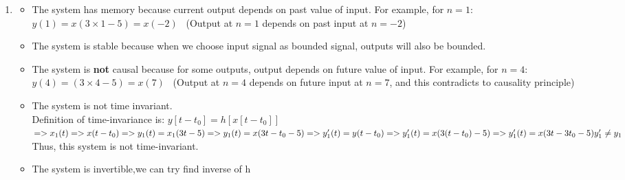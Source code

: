 \documentclass[10pt,a4paper, margin=1in]{article}
\begin{document}
\begin{enumerate}
\begin{enumerate}
\begin{itemize}
  	 $y[n] = h[x[3n - 5]]\\
  	 x[n]= h^{-1}[y[(n+5)/3]]$
  	 \item The system is linear if superposition property hold\\
  	 $y[n]=x[3n-5]\\
  	 y_1[n]=x_1[3n-5]\\
  	 y_2[n]=x_2[3n-5]\\
  	 x_3=a_1 \times x_1 + a_2 \times x_2 \\
  	 y_3=x_3[3n-5]\\
  	 y_3=a_1\times x_1[3n-5]+a_2 \times x_2[3n-5]\\
  	 y_3' = a_1 \times y_1+a_2 \times y_2\\
  	 y_3=y_3' $
  	 This system is linear
  	 
	\end{itemize}
    \item %
    \begin{itemize}
    \item The system has memory because current output depends on past value of input. For example, for $n = 1$: \\
  	$y(1) = x(3 \times 1 -5) = x(-2)$ \ (Output at $n=1$ depends on past input at $n=-2$)
  	\item The system is stable because when we choose input signal as bounded signal, outputs will also be bounded.
  	\item The system is \textbf{not} causal because for some outputs, output depends on future value of input. For example, for $n=4$: \\
  	 $y(4) = (3 \times 4 -5) = x(7)$ \ (Output at $n=4$ depends on future input at $n=7$, and this contradicts to causality principle)
  	 \item	The system is not time invariant. \\
  	  Definition of time-invariance is: $y[t-t_0] = h[x[t - t_0]]$ \\ $ =>x_1(t)=>x(t-t_0)\\
  	   =>y_1(t) = x_1(3t-5)\\
  	   =>y_1(t)=x(3t-t_0-5)\\ 
  	   =>y_1'(t)=y(t-t_0)\\
  	   =>y_1'(t)=x(3(t-t_0)-5)\\
  	   =>y_1'(t)=x(3t-3t_0-5)\\
  	   y_1' \neq y_1
  	   $ \\
  	   Thus, this system is not time-invariant.
  	 \item The system is  invertible,we can try find inverse of h\\

\end{itemize}
\end{enumerate}
\end{enumerate}
\end{document}
